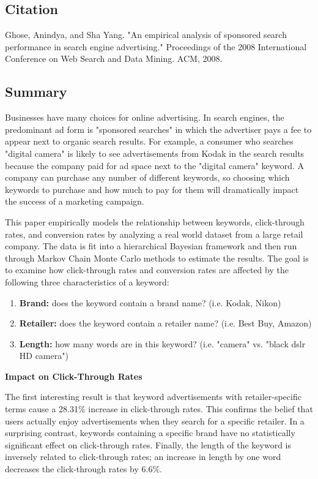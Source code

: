 \documentclass[../summaries.tex]{subfiles}
\begin{document}
\subsection{Citation}
Ghose, Anindya, and Sha Yang. "An empirical analysis of sponsored search performance in search engine advertising." Proceedings of the 2008 International Conference on Web Search and Data Mining. ACM, 2008.

\subsection{Summary}
Businesses have many choices for online advertising. In search engines, the predominant ad form is "sponsored searches" in which the advertiser pays a fee to appear next to organic search results. For example, a consumer who searches "digital camera" is likely to see advertisements from Kodak in the search results because the company paid for ad space next to the "digital camera" keyword. A company can purchase any number of different keywords, so choosing which keywords to purchase and how much to pay for them will dramatically impact the success of a marketing campaign.

This paper empirically models the relationship between keywords, click-through rates, and conversion rates by analyzing a real world dataset from a large retail company. The data is fit into a hierarchical Bayesian framework and then run through Markov Chain Monte Carlo methods to estimate the results. The goal is to examine how click-through rates and conversion rates are affected by the following three characteristics of a keyword:

\begin{enumerate}
\item \textbf{Brand:}  does the keyword contain a brand name? (i.e. Kodak, Nikon)
\item \textbf{Retailer:}  does the keyword contain a retailer name? (i.e. Best Buy, Amazon)
\item \textbf{Length:}  how many words are in this keyword? (i.e. "camera" vs. "black dslr HD camera")
\end{enumerate}

\textbf{Impact on Click-Through Rates}

The first interesting result is that keyword advertisements with retailer-specific terms cause a 28.31\% increase in click-through rates. This confirms the belief that users actually enjoy advertisements when they search for a specific retailer. In a surprising contrast, keywords containing a specific brand have no statistically significant effect on click-through rates. Finally, the length of the keyword is inversely related to click-through rates; an increase in length by one word decreases the click-through rates by 6.6\%.
\end{document}
